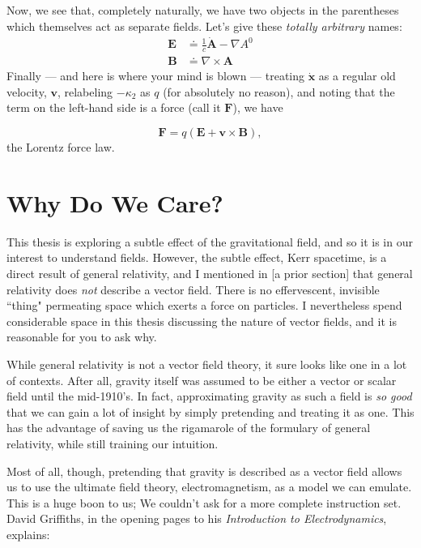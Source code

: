 \documentclass[11pt]{article}
\begin{document}
Now, we see that, completely naturally, we have two objects in the parentheses which themselves act as separate fields.  Let's give these \emph{totally arbitrary} names:
\begin{align}
\mathbf{E} &\doteq \frac{1}{c}\dot{\mathbf{A}} - \nabla A^{0}\\
\mathbf{B} &\doteq \nabla \times \mathbf{A}
\end{align}
Finally --- and here is where your mind is blown --- treating $\dot{\mathbf{x}}$ as a regular old velocity, $\mathbf{v}$, relabeling $-\kappa_2$ as $q$ (for absolutely no reason), and noting that the term on the left-hand side is a force (call it $\mathbf{F}$), we have

\begin{equation}\label{eq:lorentz}
\boxed{\mathbf{F} = q\left(\mathbf{E+v\times B}\right),}
\end{equation}
the Lorentz force law.

\section{Why Do We Care?}
This thesis is exploring a subtle effect of the gravitational field, and so it is in our interest to understand fields.  However, the subtle effect, Kerr spacetime, is a direct result of general relativity, and I mentioned in [a prior section] that general relativity does \emph{not} describe a vector field.  There is no effervescent, invisible ``thing" permeating space which exerts a force on particles.  I nevertheless spend considerable space in this thesis discussing the nature of vector fields, and it is reasonable for you to ask why.

While general relativity is not a vector field theory, it sure looks like one in a lot of contexts.  After all, gravity itself was assumed to be either a vector or scalar field until the mid-1910's.  In fact, approximating gravity as such a field is \emph{so good} that we can gain a lot of insight by simply pretending and treating it as one.  This has the advantage of saving us the rigamarole of the formulary of general relativity, while still training our intuition.

Most of all, though, pretending that gravity is described as a vector field allows us to use the ultimate field theory, electromagnetism, as a model we can emulate.  This is a huge boon to us; We couldn't ask for a more complete instruction set.  David Griffiths, in the opening pages to his \emph{Introduction to Electrodynamics}, explains:
  
\end{document}
